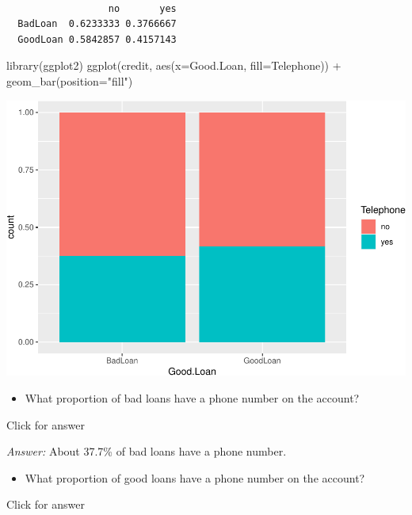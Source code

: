 \documentclass[
]{book}
\newenvironment{Shaded}{\begin{snugshade}}{\end{snugshade}}
\newcommand{\AttributeTok}[1]{\textcolor[rgb]{0.77,0.63,0.00}{#1}}
\newcommand{\FunctionTok}[1]{\textcolor[rgb]{0.00,0.00,0.00}{#1}}
\newcommand{\NormalTok}[1]{#1}
\newcommand{\SpecialCharTok}[1]{\textcolor[rgb]{0.00,0.00,0.00}{#1}}
\newcommand{\StringTok}[1]{\textcolor[rgb]{0.31,0.60,0.02}{#1}}
\providecommand{\tightlist}{%
  \setlength{\itemsep}{0pt}\setlength{\parskip}{0pt}}
\begin{document}
\begin{verbatim}
          
                  no       yes
  BadLoan  0.6233333 0.3766667
  GoodLoan 0.5842857 0.4157143
\end{verbatim}

\begin{Shaded}
\begin{Highlighting}[]
\FunctionTok{library}\NormalTok{(ggplot2)}
\FunctionTok{ggplot}\NormalTok{(credit, }\FunctionTok{aes}\NormalTok{(}\AttributeTok{x=}\NormalTok{Good.Loan, }\AttributeTok{fill=}\NormalTok{Telephone)) }\SpecialCharTok{+} \FunctionTok{geom\_bar}\NormalTok{(}\AttributeTok{position=}\StringTok{"fill"}\NormalTok{)}
\end{Highlighting}
\end{Shaded}

\includegraphics[width=1\linewidth]{Class_Activity_8_files/figure-latex/unnamed-chunk-15-1}

\begin{itemize}
\tightlist
\item
  What proportion of bad loans have a phone number on the account?
\end{itemize}

Click for answer

\emph{Answer:} About 37.7\% of bad loans have a phone number.

\begin{itemize}
\tightlist
\item
  What proportion of good loans have a phone number on the account?
\end{itemize}

Click for answer
\end{document}
